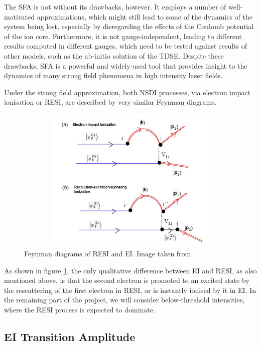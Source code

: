 \documentclass[11pt]{article}
\numberwithin{equation}{section}
\begin{document}
\par
The SFA is not without its drawbacks, however. It employs a number of well-motivated approximations, which might still lead to some of the dynamics of the system being lost, especially by disregarding the effects of the Coulomb potential of the ion core. Furthermore, it is not gauge-independent, leading to different results computed in different gauges, which need to be tested against results of other models, such as the ab-initio solution of the TDSE. Despite these drawbacks, SFA is a powerful and widely-used tool that provides insight to the dynamics of many strong field phenomena in high intensity laser fields.
\par
Under the strong field approximation, both NSDI processes, via electron impact ionisation or RESI, are described by very similar Feynman diagrams.
\begin{figure}[!htb]
    \centering
    \includegraphics[width=14cm,height=7cm]{Figures/feynman.png}
    \caption{Feynman diagrams of RESI and EI. Image taken from \cite{a2011_electronelectron}}
    \label{fig:feynmann}
\end{figure}
As shown in figure \ref{fig:feynmann}, the only qualitative difference between EI and RESI, as also mentioned above, is that the second electron is promoted to an excited state by the rescattering of the first electron in RESI, or is instantly ionised by it in EI. In the remaining part of the project, we will consider below-threshold intensities, where the RESI process is expected to dominate.

\subsection{EI Transition Amplitude}
\end{document}

